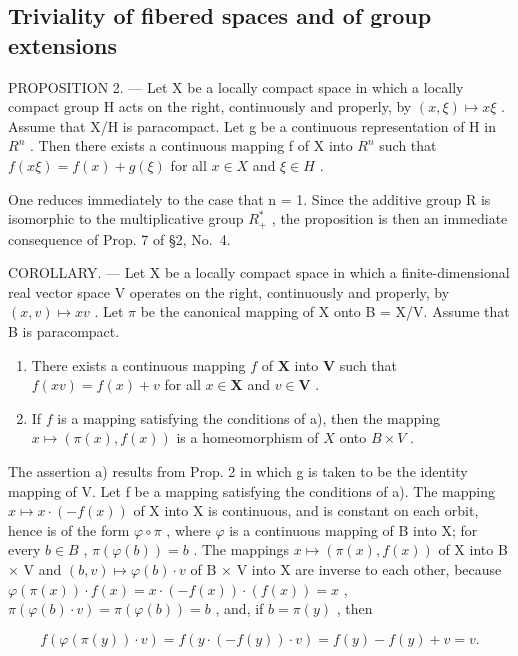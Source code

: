 \subsection{Triviality of fibered spaces and of group extensions}

PROPOSITION 2. --- Let X be a locally compact space in which a locally compact group H acts on the right, continuously and properly, by \((x,\xi)\mapsto x\xi\) . Assume that X/H is paracompact. Let g be a continuous representation of H in \(R^{n}\) . Then there exists a continuous mapping f of X into \(R^{n}\) such that \(f(x\xi)=f(x)+g(\xi)\) for all \(x\in X\) and \(\xi\in H\) .

One reduces immediately to the case that n = 1. Since the additive group R is isomorphic to the multiplicative group \(R_{+}^{*}\) , the proposition is then an immediate consequence of Prop. 7 of §2, No.~4.

COROLLARY. --- Let X be a locally compact space in which a finite-dimensional real vector space V operates on the right, continuously and properly, by \((x,v)\mapsto xv\) . Let \(\pi\) be the canonical mapping of X onto B = X/V. Assume that B is paracompact.

\begin{enumerate}
\def\labelenumi{\alph{enumi})}
\item
  There exists a continuous mapping \(f\) of \(\mathbf{X}\) into \(\mathbf{V}\) such that \(f(xv) = f(x) + v\) for all \(x \in \mathbf{X}\) and \(v \in \mathbf{V}\) .
\item
  If \(f\) is a mapping satisfying the conditions of a), then the mapping \(x \mapsto (\pi(x), f(x))\) is a homeomorphism of \(X\) onto \(B \times V\) .
\end{enumerate}

The assertion a) results from Prop. 2 in which g is taken to be the identity mapping of V. Let f be a mapping satisfying the conditions of a). The mapping \(x \mapsto x \cdot (-f(x))\) of X into X is continuous, and is constant on each orbit, hence is of the form \(\varphi \circ \pi\) , where \(\varphi\) is a continuous mapping of B into X; for every \(b \in B\) , \(\pi(\varphi(b)) = b\) . The mappings \(x \mapsto (\pi(x), f(x))\) of X into B × V and \((b, v) \mapsto \varphi(b) \cdot v\) of B × V into X are inverse to each other, because \(\varphi(\pi(x)) \cdot f(x) = x \cdot (-f(x)) \cdot (f(x)) = x\) , \(\pi(\varphi(b) \cdot v) = \pi(\varphi(b)) = b\) , and, if \(b = \pi(y)\) , then

\[
f (\varphi (\pi (y)) \cdot v) = f (y \cdot (- f (y)) \cdot v) = f (y) - f (y) + v = v.
\]

